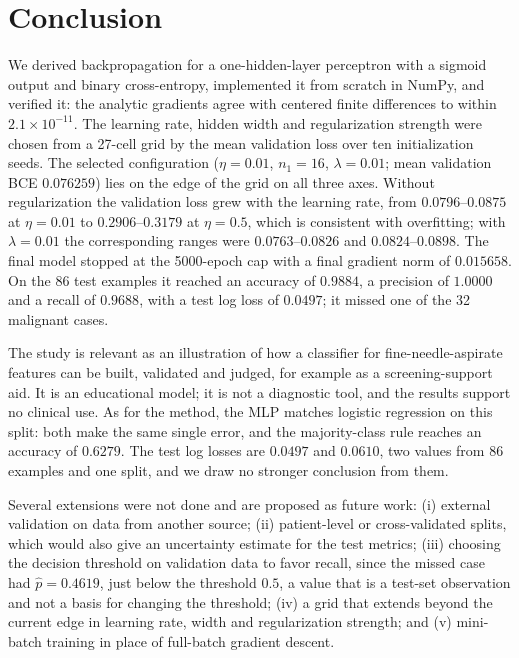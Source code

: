 \section{Conclusion}
\label{sec:concl}

We derived backpropagation for a one-hidden-layer perceptron with a sigmoid output and binary cross-entropy, implemented it from scratch in NumPy, and verified it: the analytic gradients agree with centered finite differences to within $2.1\times10^{-11}$. The learning rate, hidden width and regularization strength were chosen from a 27-cell grid by the mean validation loss over ten initialization seeds. The selected configuration ($\eta=0.01$, $n_1=16$, $\lambda=0.01$; mean validation BCE $0.076259$) lies on the edge of the grid on all three axes. Without regularization the validation loss grew with the learning rate, from $0.0796$--$0.0875$ at $\eta=0.01$ to $0.2906$--$0.3179$ at $\eta=0.5$, which is consistent with overfitting; with $\lambda=0.01$ the corresponding ranges were $0.0763$--$0.0826$ and $0.0824$--$0.0898$. The final model stopped at the 5000-epoch cap with a final gradient norm of $0.015658$. On the 86 test examples it reached an accuracy of $0.9884$, a precision of $1.0000$ and a recall of $0.9688$, with a test log loss of $0.0497$; it missed one of the 32 malignant cases.

The study is relevant as an illustration of how a classifier for fine-needle-aspirate features can be built, validated and judged, for example as a screening-support aid. It is an educational model; it is not a diagnostic tool, and the results support no clinical use. As for the method, the MLP matches logistic regression on this split: both make the same single error, and the majority-class rule reaches an accuracy of $0.6279$. The test log losses are $0.0497$ and $0.0610$, two values from 86 examples and one split, and we draw no stronger conclusion from them.

Several extensions were not done and are proposed as future work: (i) external validation on data from another source; (ii) patient-level or cross-validated splits, which would also give an uncertainty estimate for the test metrics; (iii) choosing the decision threshold on validation data to favor recall, since the missed case had $\hat p=0.4619$, just below the threshold $0.5$, a value that is a test-set observation and not a basis for changing the threshold; (iv) a grid that extends beyond the current edge in learning rate, width and regularization strength; and (v) mini-batch training in place of full-batch gradient descent.
